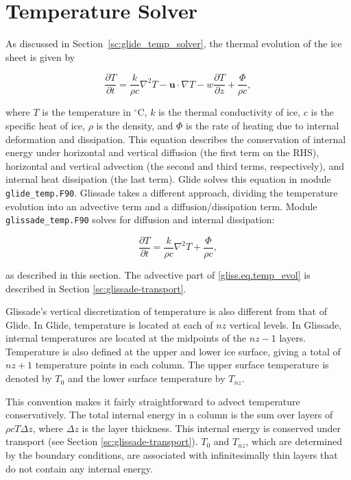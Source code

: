 
\section{Temperature Solver}
\label{sc:glissade-temperature}

As discussed in Section~\ref{sc:glide_temp_solver}, the thermal evolution of the ice sheet is given by

\begin{equation}
  \label{gliss.eq.temp_evol}
  \frac{\partial T}{\partial t} = 
  \frac{k}{\rho c} {{\nabla }^{2}}T - \mathbf{u} \cdot \nabla T - w\frac{\partial T}{\partial z} + \frac{\Phi }{\rho c},
\end{equation}

\noindent
where $T$ is the temperature in $^\circ$C, $k$ is the thermal conductivity of ice, $c$ is the specific heat of ice, 
$\rho$ is the density, and $\Phi$ is the rate of heating due to internal deformation and dissipation.
This equation describes the conservation of internal energy under horizontal and vertical 
diffusion (the first term on the RHS), horizontal and vertical advection 
(the second and third terms, respectively), and internal heat dissipation (the last term).
Glide solves this equation in module {\tt glide\_temp.F90}.
Glissade takes a different approach, dividing the temperature evolution into an advective term
and a diffusion/dissipation term.
Module {\tt glissade\_temp.F90} solves for diffusion and internal dissipation:

\begin{equation}
  \label{gliss.eq.vert_temp_evol}
  \frac{\partial T}{\partial t} = \frac{k}{\rho c}{{\nabla }^{2}}T + \frac{\Phi }{\rho c},
\end{equation}

\noindent
as described in this section.
The advective part of \eqref{gliss.eq.temp_evol} is described
in Section \ref{sc:glissade-transport}.

Glissade's vertical discretization of temperature is also different from that of Glide.
In Glide, temperature is located at each of $nz$ vertical levels.
In Glissade, internal temperatures are located at the midpoints of the $nz-1$ layers.
Temperature is also defined at the upper and lower ice surface, giving a total
of $nz+1$ temperature points in each column.  The upper surface temperature is denoted
by $T_0$ and the lower surface temperature by $T_{nz}.$

This convention makes it fairly straightforward
to advect temperature conservatively.  The total internal energy in a column 
is the sum over layers of $\rho c T \Delta z$, where $\Delta z$ is the layer thickness.
This internal energy is conserved under transport (see Section \ref{sc:glissade-transport}).
$T_0$ and $T_{nz}$, which are determined by the boundary conditions, 
are associated with infinitesimally thin layers that do not contain
any internal energy.

